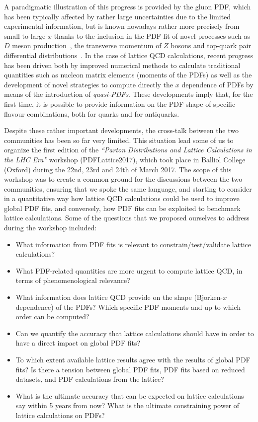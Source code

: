A paradigmatic illustration of this progress is provided by the gluon PDF, which has been
typically affected by rather large uncertainties due to the limited experimental
information, but is known nowadays rather more precisely from small to large-$x$
thanks to the inclusion in the
PDF fit of novel processes such as $D$ meson production~\cite{Gauld:2016kpd},
the transverse momentum of $Z$ bosons and top-quark pair differential
distributions~\cite{Czakon:2016olj}.
%
In the case of lattice QCD calculations, recent progress has been driven both
by improved numerical methods to calculate traditional quantities such as nucleon
matrix elements (moments of the PDFs) as well as the development of novel
strategies to compute directly the $x$ dependence of PDFs by means of the
introduction of {\it quasi-PDFs}.
%
These developments imply that, for the first time, it is possible to provide information on the PDF shape
of specific flavour combinations, both for quarks and for antiquarks.

Despite these rather important developments, the cross-talk between the
two communities has been so far very limited. This situation lead some of us
to organize the first edition of the {\it ``Parton Distributions and Lattice Calculations in the LHC Era''}
workshop (PDFLattice2017), which took
place in Balliol College (Oxford) during the 22nd, 23rd and 24th of March 2017.
%
The scope of this workshop was to create a common ground for the discussions
between the two communities, ensuring that we spoke the same language,
and starting to consider in a quantitative way how lattice QCD calculations could be used
to improve global PDF fits, and conversely, how PDF fits can be exploited to benchmark lattice calculations.
%
Some of the questions that we proposed ourselves to address during the workshop
included:
\begin{itemize}
\item What information from PDF fits is relevant to constrain/test/validate lattice calculations?

\item What PDF-related quantities are more urgent
  to compute lattice QCD, in terms of phenomenological relevance?

\item What information does lattice QCD provide on the
  shape (Bjorken-$x$ dependence) of the PDFs? Which specific
  PDF moments
  and up to which order can be computed?
  
\item Can we quantify the accuracy that lattice calculations should have
  in order to have a direct impact on global PDF fits?

\item To which extent available lattice results agree with the results of
  global PDF fits? Is there a tension between global PDF fits, PDF
  fits based on reduced datasets, and PDF calculations from the lattice?

  \item What is the ultimate accuracy that can be expected on lattice
calculations say within 5 years from now? What is the ultimate
constraining power of lattice calculations on PDFs?

\end{itemize}

